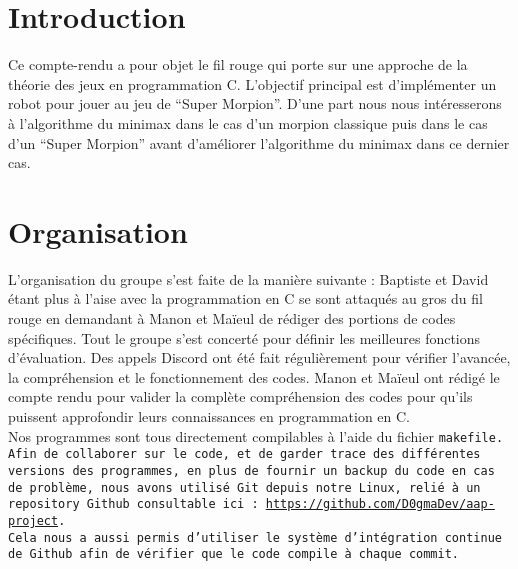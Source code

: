\documentclass[14pt,a4paper]{article}
\begin{document}

\section*{Introduction}
Ce compte-rendu a pour objet le fil rouge qui porte sur une approche de la théorie des jeux en programmation C. L'objectif principal est d'implémenter un robot pour jouer au jeu de “Super Morpion”. D'une part nous nous intéresserons à l'algorithme du minimax dans le cas d'un morpion classique puis dans le cas d'un “Super Morpion” avant d'améliorer l'algorithme du minimax dans ce dernier cas.\\


\section*{Organisation}
L'organisation du groupe s'est faite de la manière suivante : Baptiste et David étant plus à l'aise avec la programmation en C se sont attaqués au gros du fil rouge en demandant à Manon et Maïeul de rédiger des portions de codes spécifiques. Tout le groupe s'est concerté pour définir les meilleures fonctions d'évaluation. Des appels Discord ont été fait régulièrement pour vérifier l'avancée, la compréhension et le fonctionnement des codes. Manon et Maïeul ont rédigé le compte rendu pour valider la complète compréhension des codes pour qu'ils puissent approfondir leurs connaissances en programmation en C.\\
Nos programmes sont tous directement compilables à l'aide du fichier \tt{makefile}.
Afin de collaborer sur le code, et de garder trace des différentes versions des programmes, en plus de fournir un backup du code en cas de problème, nous avons utilisé Git depuis notre Linux, relié à un repository Github consultable ici : \url{https://github.com/D0gmaDev/aap-project}\footnotemark.\\

Cela nous a aussi permis d'utiliser le système d'intégration continue de Github afin de vérifier que le code compile à chaque commit.

\end{document}
